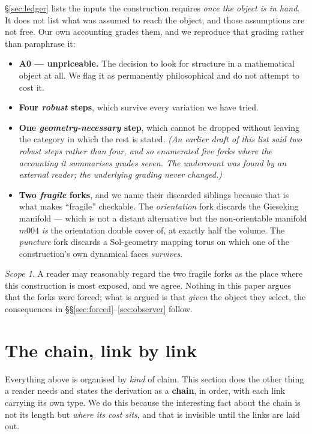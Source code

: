 \documentclass[11pt,a4paper]{article}
\theoremstyle{definition}
\theoremstyle{remark}
\newtheorem{scopenote}{Scope}
\begin{document}
\S\ref{sec:ledger} lists the inputs the construction requires \emph{once the object is in hand}. It
does not list what was assumed to reach the object, and those assumptions are not free. Our own
accounting grades them, and we reproduce that grading rather than paraphrase it:

\begin{itemize}[leftmargin=1.4em,itemsep=2pt]
\item \textbf{A0 --- unpriceable.} The decision to look for structure in a mathematical object at
all. We flag it as permanently philosophical and do not attempt to cost it.
\item \textbf{Four \emph{robust} steps}, which survive every variation we have tried.
\item \textbf{One \emph{geometry-necessary} step}, which cannot be dropped without leaving the
category in which the rest is stated. \emph{(An earlier draft of this list said two robust steps
rather than four, and so enumerated five forks where the accounting it summarises grades seven.
The undercount was found by an external reader; the underlying grading never changed.)}
\item \textbf{Two \emph{fragile} forks}, and we name their discarded siblings because that is what
makes ``fragile'' checkable. The \emph{orientation} fork discards the Gieseking manifold --- which is not a distant
alternative but the non-orientable manifold $m004$ \emph{is} the orientation double cover of, at
exactly half the volume. The \emph{puncture} fork discards a
Sol-geometry mapping torus on which one of the construction's own dynamical faces \emph{survives}.
\end{itemize}

\begin{scopenote}
A reader may reasonably regard the two fragile forks as the place where this construction is most
exposed, and we agree. Nothing in this paper argues that the forks were forced; what is argued is
that \emph{given} the object they select, the consequences in
\S\S\ref{sec:forced}--\ref{sec:observer} follow.
\end{scopenote}

\section{The chain, link by link}\label{sec:chain}

Everything above is organised by \emph{kind} of claim. This section does the other thing a reader
needs and states the derivation as a \textbf{chain}, in order, with each link carrying its own type.
We do this because the interesting fact about the chain is not its length but \emph{where its cost
sits}, and that is invisible until the links are laid out.
\end{document}

